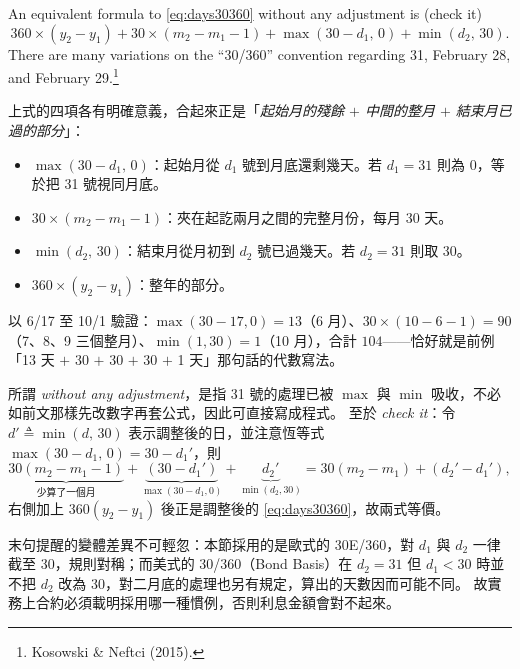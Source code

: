 \begin{remark}
	An equivalent formula to \eqref{eq:days30360} without any adjustment is (check it)
	\[
		360 \times (y_{2}-y_{1}) + 30 \times (m_{2}-m_{1}-1)
		+ \max(30-d_{1},\, 0) + \min(d_{2},\, 30) .
	\]
	There are many variations on the ``30/360'' convention regarding 31, February 28, and February 29.\footnote{Kosowski \& Neftci (2015).}
\end{remark}

\suppstart
\begin{remark}
	上式的四項各有明確意義，合起來正是「\emph{起始月的殘餘 $+$ 中間的整月 $+$ 結束月已過的部分}」：
	\begin{itemize}[nosep]
		\item $\max(30-d_{1},\,0)$：起始月從 $d_{1}$ 號到月底還剩幾天。若 $d_{1} = 31$ 則為 $0$，等於把 31 號視同月底。
		\item $30 \times (m_{2}-m_{1}-1)$：夾在起訖兩月之間的完整月份，每月 30 天。
		\item $\min(d_{2},\,30)$：結束月從月初到 $d_{2}$ 號已過幾天。若 $d_{2} = 31$ 則取 $30$。
		\item $360 \times (y_{2}-y_{1})$：整年的部分。
	\end{itemize}
	以 6/17 至 10/1 驗證：$\max(30-17,0) = 13$（6 月）、$30 \times (10-6-1) = 90$（7、8、9 三個整月）、$\min(1,30) = 1$（10 月），合計 $104$——恰好就是前例「13 天 $+$ 30 $+$ 30 $+$ 30 $+$ 1 天」那句話的代數寫法。

	所謂 \emph{without any adjustment}，是指 31 號的處理已被 $\max$ 與 $\min$ 吸收，不必如前文那樣先改數字再套公式，因此可直接寫成程式。
	至於 \emph{check it}：令 $d' \triangleq \min(d,\,30)$ 表示調整後的日，並注意恆等式 $\max(30-d_{1},\,0) = 30 - d_{1}'$，則
	\[
		\underbrace{30(m_{2}-m_{1}-1)}_{\text{少算了一個月}} + \underbrace{(30-d_{1}')}_{\max(30-d_{1},0)} + \underbrace{d_{2}'}_{\min(d_{2},30)}
		= 30(m_{2}-m_{1}) + (d_{2}'-d_{1}') ,
	\]
	右側加上 $360(y_{2}-y_{1})$ 後正是調整後的 \eqref{eq:days30360}，故兩式等價。

	末句提醒的變體差異不可輕忽：本節採用的是歐式的 30E/360，對 $d_{1}$ 與 $d_{2}$ 一律截至 30，規則對稱；而美式的 30/360（Bond Basis）在 $d_{2} = 31$ 但 $d_{1} < 30$ 時並不把 $d_{2}$ 改為 30，對二月底的處理也另有規定，算出的天數因而可能不同。
	故實務上合約必須載明採用哪一種慣例，否則利息金額會對不起來。
\end{remark}
\suppend

